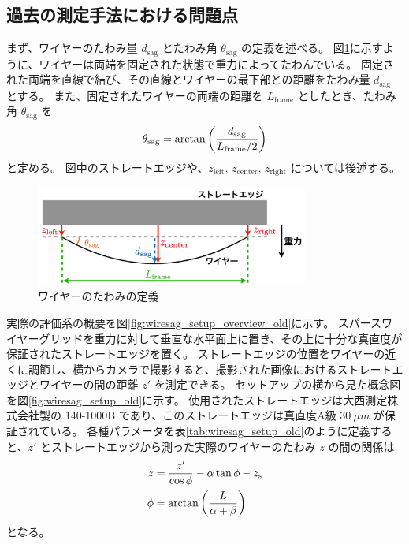 \documentclass[../../main.tex]{subfiles}
\begin{document}
\subsection{過去の測定手法における問題点}
まず、ワイヤーのたわみ量 $d_{\mathrm{sag}}$ とたわみ角 $\theta_{\mathrm{sag}}$ の定義を述べる。
図\ref{fig:wiresag_def}に示すように、ワイヤーは両端を固定された状態で重力によってたわんでいる。
固定された両端を直線で結び、その直線とワイヤーの最下部との距離をたわみ量 $d_{\mathrm{sag}}$ とする。
また、固定されたワイヤーの両端の距離を $L_{\mathrm{frame}}$ としたとき、たわみ角 $\theta_{\mathrm{sag}}$ を
\begin{equation}
    \theta_{\mathrm{sag}} = \arctan\qty(\dfrac{d_{\mathrm{sag}}}{L_{\mathrm{frame}}/2})
\end{equation}
と定める。
図中のストレートエッジや、$z_{\text{left}},\,z_{\text{center}},\,z_{\text{right}}$ については後述する。
\begin{figure}[H]
    \centering
    \includegraphics[width=0.8\textwidth]{wiregrid/wiresag_def.pdf}
    \caption{ワイヤーのたわみの定義}
    \label{fig:wiresag_def}
\end{figure}
実際の評価系の概要を図\ref{fig:wiresag_setup_overview_old}に示す。
スパースワイヤーグリッドを重力に対して垂直な水平面上に置き、その上に十分な真直度が保証されたストレートエッジを置く。
ストレートエッジの位置をワイヤーの近くに調節し、横からカメラで撮影すると、撮影された画像におけるストレートエッジとワイヤーの間の距離 $z'$ を測定できる。
セットアップの横から見た概念図を図\ref{fig:wiresag_setup_old}に示す。
使用されたストレートエッジは大西測定株式会社製の 140-1000B であり、このストレートエッジは真直度A級 $\SI{30}{\mu m}$ が保証されている。
各種パラメータを表\ref{tab:wiresag_setup_old}のように定義すると、$z'$ とストレートエッジから測った実際のワイヤーのたわみ $z$ の間の関係は
\begin{align}
    z &= \dfrac{z'}{\cos\phi} - \alpha\tan\phi - z_{\mathrm{s}} \\
    \phi &= \arctan\qty(\dfrac{L}{\alpha+\beta})
\end{align}
となる。
\end{document}
